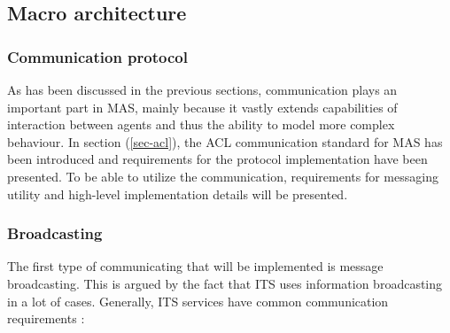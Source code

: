 \documentclass[main.tex]{subfiles}
\begin{document}

\pagebreak



\subsection{Macro architecture}

\subsubsection{Communication protocol}

As has been discussed in the previous sections, communication plays an important part in 
MAS, mainly because it vastly extends capabilities of interaction between agents and thus 
the ability to model more complex behaviour. In section (\ref{sec-acl}), the ACL communication 
standard for MAS has been introduced and requirements for the protocol implementation have 
been presented. To be able to 
utilize the communication, requirements for messaging utility and high-level implementation 
details will be presented. 

\subsubsection{Broadcasting}

The first type of communicating that will be implemented is message broadcasting. This is 
argued by the fact that ITS uses information broadcasting in a lot of cases.
Generally, ITS services have common communication requirements \cite{Santa2013}:
\end{document}
